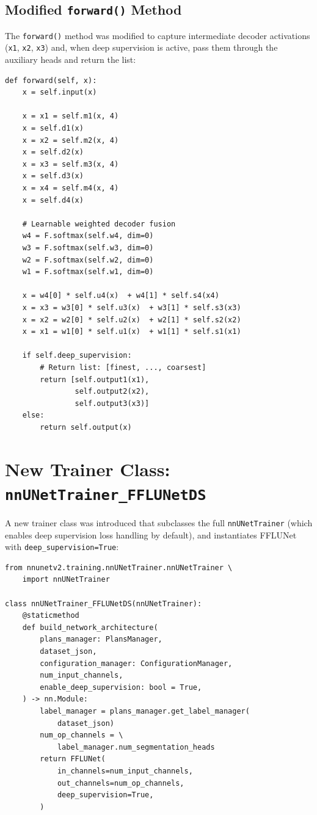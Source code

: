 \documentclass[12pt,a4paper]{report}
\begin{document}
\subsection{Modified \texttt{forward()} Method}

The \texttt{forward()} method was modified to capture intermediate decoder activations (\texttt{x1}, \texttt{x2}, \texttt{x3}) and, when deep supervision is active, pass them through the auxiliary heads and return the list:

\begin{lstlisting}[caption={FFLUNet forward() with deep supervision branching}, label={lst:fflunet_fwd}]
def forward(self, x):
    x = self.input(x)

    x = x1 = self.m1(x, 4)
    x = self.d1(x)
    x = x2 = self.m2(x, 4)
    x = self.d2(x)
    x = x3 = self.m3(x, 4)
    x = self.d3(x)
    x = x4 = self.m4(x, 4)
    x = self.d4(x)

    # Learnable weighted decoder fusion
    w4 = F.softmax(self.w4, dim=0)
    w3 = F.softmax(self.w3, dim=0)
    w2 = F.softmax(self.w2, dim=0)
    w1 = F.softmax(self.w1, dim=0)

    x = w4[0] * self.u4(x)  + w4[1] * self.s4(x4)
    x = x3 = w3[0] * self.u3(x)  + w3[1] * self.s3(x3)
    x = x2 = w2[0] * self.u2(x)  + w2[1] * self.s2(x2)
    x = x1 = w1[0] * self.u1(x)  + w1[1] * self.s1(x1)

    if self.deep_supervision:
        # Return list: [finest, ..., coarsest]
        return [self.output1(x1),
                self.output2(x2),
                self.output3(x3)]
    else:
        return self.output(x)
\end{lstlisting}

\section{New Trainer Class: \texttt{nnUNetTrainer\_FFLUNetDS}}

A new trainer class was introduced that subclasses the full \texttt{nnUNetTrainer} (which enables deep supervision loss handling by default), and instantiates FFLUNet with \texttt{deep\_supervision=True}:

\begin{lstlisting}[caption={nnUNetTrainer\_FFLUNetDS -- new deep supervision trainer}, label={lst:ds_trainer}]
from nnunetv2.training.nnUNetTrainer.nnUNetTrainer \
    import nnUNetTrainer

class nnUNetTrainer_FFLUNetDS(nnUNetTrainer):
    @staticmethod
    def build_network_architecture(
        plans_manager: PlansManager,
        dataset_json,
        configuration_manager: ConfigurationManager,
        num_input_channels,
        enable_deep_supervision: bool = True,
    ) -> nn.Module:
        label_manager = plans_manager.get_label_manager(
            dataset_json)
        num_op_channels = \
            label_manager.num_segmentation_heads
        return FFLUNet(
            in_channels=num_input_channels,
            out_channels=num_op_channels,
            deep_supervision=True,
        )
\end{lstlisting}
\end{document}
